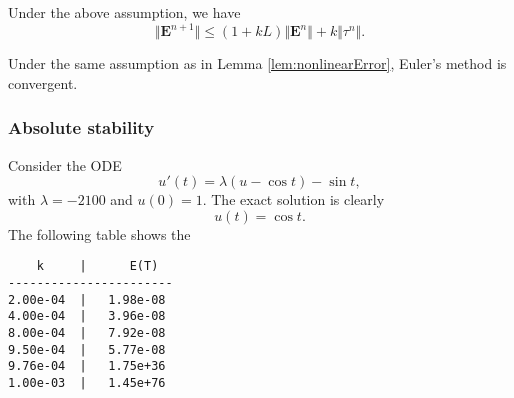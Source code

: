 \begin{lem}\label{lem:nonlinearError}
  Under the above assumption, we have
  \begin{equation}
    \label{eq:nonlinearError}
    \Vert \mathbf{E}^{n+1}\Vert \leq (1+kL)\Vert \mathbf{E}^{n}\Vert
    +k\Vert \tau^{n}\Vert.
  \end{equation}
\end{lem}

\begin{thm}
  Under the same assumption as in Lemma \ref{lem:nonlinearError},
  Euler's method is convergent.
\end{thm}

\subsubsection{Absolute stability}

\label{sec:absolute-stability}
\begin{exm}
  Consider the ODE
  \begin{displaymath}
    u'(t)=\lambda(u-\cos t)-\sin t,
  \end{displaymath}
  with $\lambda=-2100$ and $u(0)=1.$
  The exact solution is clearly
  \begin{displaymath}
    u(t)=\cos t.
  \end{displaymath}
  The following table shows the 
\begin{verbatim}
    k     |      E(T)  
-----------------------
2.00e-04  |   1.98e-08    
4.00e-04  |   3.96e-08    
8.00e-04  |   7.92e-08    
9.50e-04  |   5.77e-08    
9.76e-04  |   1.75e+36    
1.00e-03  |   1.45e+76   
\end{verbatim}
\end{exm}


